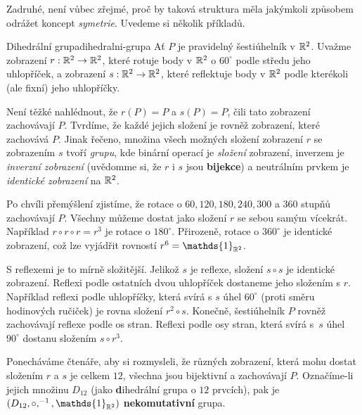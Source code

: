 Zadruhé, není vůbec zřejmé, proč by taková struktura měla jakýmkoli způsobem
odrážet koncept \emph{symetrie}. Uvedeme si několik příkladů.

\begin{example}{Dihedrální grupa}{dihedralni-grupa}
 Ať $P$ je pravidelný šestiúhelník v $\mathbb{R}^2$. Uvažme zobrazení $r:\mathbb{R}^2 \to \mathbb{R}^2$,
 které rotuje body v $\mathbb{R}^2$ o $60^{ \circ }$ podle středu jeho uhlopříček, a
 zobrazení $s:\mathbb{R}^2 \to \mathbb{R}^2$, které reflektuje body v $\mathbb{R}^2$ podle kterékoli
 (ale fixní) jeho uhlopříčky.

 Není těžké nahlédnout, že $r(P) = P$ a $s(P) = P$, čili tato zobrazení
 zachovávají $P$. Tvrdíme, že každé jejich složení je rovněž zobrazení, které
 zachovává $P$. Jinak řečeno, množina všech možných složení zobrazení $r$ se
 zobrazením $s$ tvoří \emph{grupu}, kde binární operací je \emph{složení}
 zobrazení, inverzem je \emph{inverzní zobrazení} (uvědomme si, že $r$ i $s$ jsou
 \textbf{bijekce}) a neutrálním prvkem je \emph{identické zobrazení} na $\mathbb{R}^2$.

 Po chvíli přemýšlení zjistíme, že rotace o $60,120,180,240,300$ a $360$ stupňů
 zachovávají $P$. Všechny můžeme dostat jako složení $r$ se sebou samým
 vícekrát. Například $r \circ r \circ r = r^3$ je rotace o $180^{ \circ }$.
 Přirozeně, rotace o $360^{ \circ }$ je identické zobrazení, což lze vyjádřit
 rovností $r^{6} = \mathds{1}_{\R^2}$.

 S reflexemi je to mírně složitější. Jelikož $s$ je reflexe, složení $s \circ s$
 je identické zobrazení. Reflexi podle ostatních dvou uhlopříček dostaneme jeho
 složením s $r$. Například reflexi podle uhlopříčky, která svírá s $s$ úhel
 $60^{ \circ }$ (proti směru hodinových ručiček) je rovna složení $r^2 \circ s$.
 Konečně, šestiúhelník $P$ rovněž zachovávají reflexe podle os stran. Reflexi
 podle osy stran, která svírá s~$s$ úhel $90^{ \circ }$ dostanu složením $s
 \circ r^3$.

 Ponecháváme čtenáře, aby si rozmysleli, že různých zobrazení, která mohu dostat
 složením $r$ a $s$ je celkem $12$, všechna jsou bijektivní a zachovávají $P$.
 Označíme-li jejich množinu $D_{12}$ (jako \textbf{d}ihedrální grupa o $12$
 prvcích), pak je $(D_{12}, \circ ,^{-1},\mathds{1}_{\R^2})$
 \textbf{nekomutativní} grupa.

 \begin{figure}[H]
  \centering
  \begin{subfigure}[b]{\textwidth}
   \centering
\end{subfigure}
\end{figure}
\end{example}
